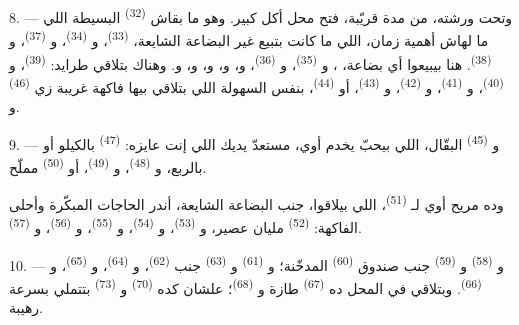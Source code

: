 \VUsaut{4.0mm}
\VUsaut{3.0mm}

8. --- وتحت ورشته، من مدة قريّبة، فتح محل أكل كبير. وهو ما بقاش
 \textsuperscript{(32)} البسيطة اللي ما لهاش أهمية زمان، اللي ما كانت
بتبيع غير البضاعة الشايعة،  \textsuperscript{(33)}،
و \textsuperscript{(34)}، و \textsuperscript{(37)}،
و \textsuperscript{(38)}. هنا بيبيعوا أي بضاعة، ،
و \textsuperscript{(35)}، و \textsuperscript{(36)}،
و، و، و، و،
و. وهناك بتلاقي طرايد:  \textsuperscript{(39)}،
و \textsuperscript{(40)}، و \textsuperscript{(41)}،
و \textsuperscript{(42)}، و \textsuperscript{(43)}، أو
 \textsuperscript{(44)}، بنفس السهولة اللي بتلاقي بيها فاكهة غريبة زي
 \textsuperscript{(46)} و.

9. --- و \textsuperscript{(45)} البقّال، اللي بيحبّ يخدم أوي، مستعدّ
يديك اللي إنت عايزه:  \textsuperscript{(47)} بالكيلو أو بالربع،
و \textsuperscript{(48)}، و \textsuperscript{(49)}، أو
 \textsuperscript{(50)} مملّح.

وده مريح أوي لـ \textsuperscript{(51)}، اللي بيلاقوا، جنب البضاعة
الشايعة، أندر الحاجات المبكّرة وأحلى الفاكهة:  \textsuperscript{(52)}
مليان عصير، و \textsuperscript{(53)}، و \textsuperscript{(54)}،
و \textsuperscript{(55)}، و \textsuperscript{(56)}، و \textsuperscript{(57)}.

\VUsaut{4.0mm}
\VUsaut{3.0mm}

10. --- و \textsuperscript{(58)} و \textsuperscript{(59)} جنب
صندوق  \textsuperscript{(60)} المدخّنة؛ و
\textsuperscript{(61)} و \textsuperscript{(63)} جنب 
\textsuperscript{(62)}، و \textsuperscript{(64)}، و
\textsuperscript{(65)}، و \textsuperscript{(66)}. وبتلاقي في المحل ده
 \textsuperscript{(67)} طازة و \textsuperscript{(68)}؛ علشان
كده  \textsuperscript{(70)} و \textsuperscript{(73)}
بتتملي بسرعة رهيبة.

